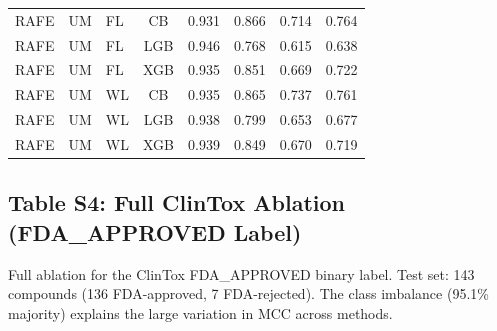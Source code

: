 \documentclass[9pt,a4paper]{article}
\begin{document}
\begin{scriptsize}
\begin{longtable}{lllcrrrr}
RAFE & UM  & FL & CB  & 0.931 & 0.866 & 0.714 & 0.764 \\
RAFE & UM  & FL & LGB & 0.946 & 0.768 & 0.615 & 0.638 \\
RAFE & UM  & FL & XGB & 0.935 & 0.851 & 0.669 & 0.722 \\
RAFE & UM  & WL & CB  & 0.935 & 0.865 & 0.737 & 0.761 \\
RAFE & UM  & WL & LGB & 0.938 & 0.799 & 0.653 & 0.677 \\
RAFE & UM  & WL & XGB & 0.939 & 0.849 & 0.670 & 0.719 \\
\end{longtable}
\end{scriptsize}

\newpage

\subsection*{Table S4: Full ClinTox Ablation (FDA\_APPROVED Label)}

Full ablation for the ClinTox FDA\_APPROVED binary label.
Test set: 143 compounds (136 FDA-approved, 7 FDA-rejected).
The class imbalance (95.1\% majority) explains the large variation in MCC across methods.
\end{document}
